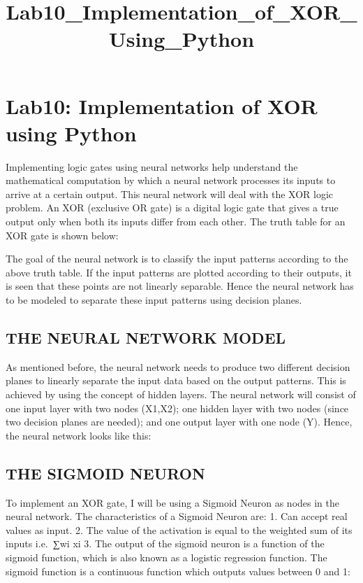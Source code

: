 \documentclass[11pt]{article}
\title{Lab10\_Implementation\_of\_XOR\_Using\_Python}
\begin{document}
    
    \maketitle
    
    

    
    \hypertarget{lab10-implementation-of-xor-using-python}{%
\section{Lab10: Implementation of XOR using
Python}\label{lab10-implementation-of-xor-using-python}}

    Implementing logic gates using neural networks help understand the
mathematical computation by which a neural network processes its inputs
to arrive at a certain output. This neural network will deal with the
XOR logic problem. An XOR (exclusive OR gate) is a digital logic gate
that gives a true output only when both its inputs differ from each
other. The truth table for an XOR gate is shown below:

    The goal of the neural network is to classify the input patterns
according to the above truth table. If the input patterns are plotted
according to their outputs, it is seen that these points are not
linearly separable. Hence the neural network has to be modeled to
separate these input patterns using decision planes.

    \hypertarget{the-neural-network-model}{%
\subsection{THE NEURAL NETWORK MODEL}\label{the-neural-network-model}}

    As mentioned before, the neural network needs to produce two different
decision planes to linearly separate the input data based on the output
patterns. This is achieved by using the concept of hidden layers. The
neural network will consist of one input layer with two nodes (X1,X2);
one hidden layer with two nodes (since two decision planes are needed);
and one output layer with one node (Y). Hence, the neural network looks
like this:

    \hypertarget{the-sigmoid-neuron}{%
\subsection{THE SIGMOID NEURON}\label{the-sigmoid-neuron}}

    To implement an XOR gate, I will be using a Sigmoid Neuron as nodes in
the neural network. The characteristics of a Sigmoid Neuron are: 1. Can
accept real values as input. 2. The value of the activation is equal to
the weighted sum of its inputs i.e.~∑wi xi 3. The output of the sigmoid
neuron is a function of the sigmoid function, which is also known as a
logistic regression function. The sigmoid function is a continuous
function which outputs values between 0 and 1:
\end{document}
